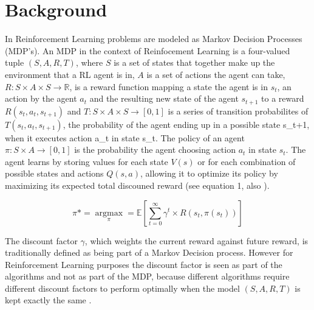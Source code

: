 
\section{Background}

In Reinforcement Learning problems are modeled as Markov Decision Processes (MDP's). An MDP in the context of Reinfocement Learning
is a four-valued tuple $(S,A,R,T)$, where $S$ is a set of states that together make up the environment that a RL agent is in,
 $A$ is a set of actions the agent can take, $R: S \times A \times S \rightarrow \mathbb{R}$, is a reward function mapping a state the agent is in $s_t$,
 an action by the agent $a_t$ and the resulting new state of the agent $s_{t+1}$ to a reward $R(s_t,a_t,s_{t+1})$
 and $T: S \times A \times S \rightarrow [0,1]$ is a series of transition probabilites of $T(s_t,a_t,s_{t+1})$, the probability of the agent
 ending up in a possible state s_{t+1}, when it executes action a_t in state s_t. The policy of an agent $\pi: S \times A \rightarrow [0,1]$ is the probability
 the agent choosing action $a_t$ in state $s_t$. The agent learns by storing values for each
 state $V(s)$ or for each combination of possible states and actions $Q(s,a)$, allowing it to optimize its policy by maximizing its expected total discouned reward
 (see equation 1, also \cite{zimmer2016neural}).

 $$\pi* = \underset{\pi}{\operatorname{argmax}} = \mathbb{E}\left [ \sum_{t = 0}^{\infty}\gamma^{t} \times R(s_t,\pi(s_t))\right ]$$


The discount factor $\gamma$, which weights the current reward against future reward, is traditionally defined
as being part of a Markov Decision process. However for Reinforcement Learning purposes the discount factor is seen as part
of the algorithms and not as part of the MDP, because different algorithms require different discount factors to perform optimally when the model
$(S,A,R,T)$ is kept exactly the same \cite{van2007reinforcement}.